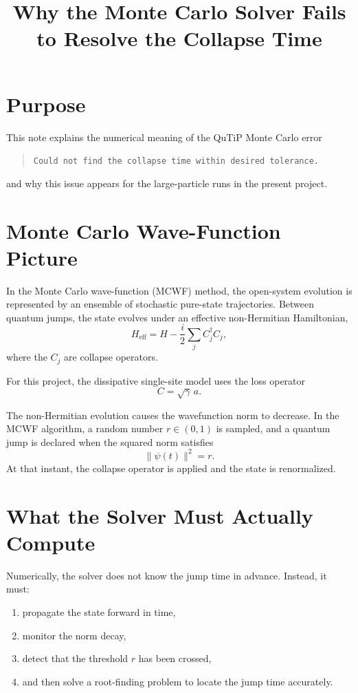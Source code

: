 \documentclass[12pt]{article}
\title{Why the Monte Carlo Solver Fails to Resolve the Collapse Time}
\author{}
\date{}
\begin{document}
\maketitle

\section*{Purpose}
This note explains the numerical meaning of the QuTiP Monte Carlo error
\begin{quote}
\texttt{Could not find the collapse time within desired tolerance.}
\end{quote}
and why this issue appears for the large-particle runs in the present project.

\section*{Monte Carlo Wave-Function Picture}
In the Monte Carlo wave-function (MCWF) method, the open-system evolution is represented by an ensemble of stochastic pure-state trajectories. Between quantum jumps, the state evolves under an effective non-Hermitian Hamiltonian,
\[
H_{\mathrm{eff}} = H - \frac{i}{2}\sum_j C_j^\dagger C_j,
\]
where the $C_j$ are collapse operators.

For this project, the dissipative single-site model uses the loss operator
\[
C = \sqrt{\gamma}\,a.
\]

The non-Hermitian evolution causes the wavefunction norm to decrease. In the MCWF algorithm, a random number $r \in (0,1)$ is sampled, and a quantum jump is declared when the squared norm satisfies
\[
\lVert \psi(t) \rVert^2 = r.
\]
At that instant, the collapse operator is applied and the state is renormalized.

\section*{What the Solver Must Actually Compute}
Numerically, the solver does not know the jump time in advance. Instead, it must:
\begin{enumerate}
\item propagate the state forward in time,
\item monitor the norm decay,
\item detect that the threshold $r$ has been crossed,
\item and then solve a root-finding problem to locate the jump time accurately.
\end{enumerate}
\end{document}
